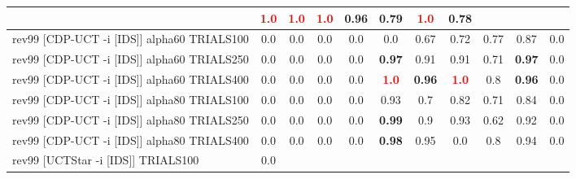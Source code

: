 \documentclass{article}
\begin{document}
\begin{tabular}{|l|r@{$\pm$}rr@{$\pm$}rr@{$\pm$}rr@{$\pm$}rr@{$\pm$}rr@{$\pm$}rr@{$\pm$}rr@{$\pm$}rr@{$\pm$}rr@{$\pm$}r|}
& \multicolumn{2}{c}{\textbf{\textcolor{red}{1.0}}}
& \multicolumn{2}{c}{\textbf{\textcolor{red}{1.0}}}
& \multicolumn{2}{c}{\textbf{\textcolor{red}{1.0}}}
& \multicolumn{2}{c}{0.96}
& \multicolumn{2}{c}{0.79}
& \multicolumn{2}{c}{\textbf{\textcolor{red}{1.0}}}
& \multicolumn{2}{c|}{0.78}
\\
\hline
rev99 [CDP-UCT -i [IDS]] alpha60 TRIALS100
& \multicolumn{2}{c}{0.0}
& \multicolumn{2}{c}{0.0}
& \multicolumn{2}{c}{0.0}
& \multicolumn{2}{c}{0.0}
& \multicolumn{2}{c}{0.0}
& \multicolumn{2}{c}{0.67}
& \multicolumn{2}{c}{0.72}
& \multicolumn{2}{c}{0.77}
& \multicolumn{2}{c}{0.87}
& \multicolumn{2}{c|}{0.0}
\\
rev99 [CDP-UCT -i [IDS]] alpha60 TRIALS250
& \multicolumn{2}{c}{0.0}
& \multicolumn{2}{c}{0.0}
& \multicolumn{2}{c}{0.0}
& \multicolumn{2}{c}{0.0}
& \multicolumn{2}{c}{\textbf{0.97}}
& \multicolumn{2}{c}{0.91}
& \multicolumn{2}{c}{0.91}
& \multicolumn{2}{c}{0.71}
& \multicolumn{2}{c}{\textbf{0.97}}
& \multicolumn{2}{c|}{0.0}
\\
rev99 [CDP-UCT -i [IDS]] alpha60 TRIALS400
& \multicolumn{2}{c}{0.0}
& \multicolumn{2}{c}{0.0}
& \multicolumn{2}{c}{0.0}
& \multicolumn{2}{c}{0.0}
& \multicolumn{2}{c}{\textbf{\textcolor{red}{1.0}}}
& \multicolumn{2}{c}{\textbf{0.96}}
& \multicolumn{2}{c}{\textbf{\textcolor{red}{1.0}}}
& \multicolumn{2}{c}{0.8}
& \multicolumn{2}{c}{\textbf{0.96}}
& \multicolumn{2}{c|}{0.0}
\\
rev99 [CDP-UCT -i [IDS]] alpha80 TRIALS100
& \multicolumn{2}{c}{0.0}
& \multicolumn{2}{c}{0.0}
& \multicolumn{2}{c}{0.0}
& \multicolumn{2}{c}{0.0}
& \multicolumn{2}{c}{0.93}
& \multicolumn{2}{c}{0.7}
& \multicolumn{2}{c}{0.82}
& \multicolumn{2}{c}{0.71}
& \multicolumn{2}{c}{0.84}
& \multicolumn{2}{c|}{0.0}
\\
rev99 [CDP-UCT -i [IDS]] alpha80 TRIALS250
& \multicolumn{2}{c}{0.0}
& \multicolumn{2}{c}{0.0}
& \multicolumn{2}{c}{0.0}
& \multicolumn{2}{c}{0.0}
& \multicolumn{2}{c}{\textbf{0.99}}
& \multicolumn{2}{c}{0.9}
& \multicolumn{2}{c}{0.93}
& \multicolumn{2}{c}{0.62}
& \multicolumn{2}{c}{0.92}
& \multicolumn{2}{c|}{0.0}
\\
rev99 [CDP-UCT -i [IDS]] alpha80 TRIALS400
& \multicolumn{2}{c}{0.0}
& \multicolumn{2}{c}{0.0}
& \multicolumn{2}{c}{0.0}
& \multicolumn{2}{c}{0.0}
& \multicolumn{2}{c}{\textbf{0.98}}
& \multicolumn{2}{c}{0.95}
& \multicolumn{2}{c}{0.0}
& \multicolumn{2}{c}{0.8}
& \multicolumn{2}{c}{0.94}
& \multicolumn{2}{c|}{0.0}
\\
rev99 [UCTStar -i [IDS]] TRIALS100
& \multicolumn{2}{c}{0.0}

\end{tabular}
\end{document}
